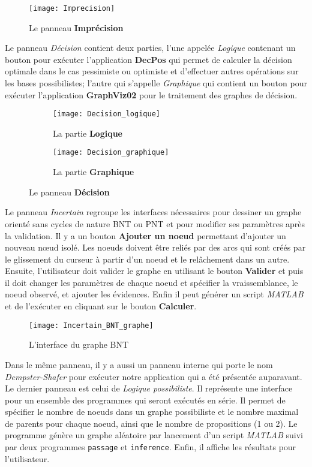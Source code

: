 \begin{figure}[H]
\centering
\texttt{[image: Imprecision]}
\caption{Le panneau \textbf{Imprécision}}
\end{figure}

Le panneau \textit{Décision} contient deux parties, l'une appelée \textit{Logique}
contenant un bouton pour exécuter l'application \textbf{DecPos} qui permet de calculer la décision optimale dans
le cas pessimiste ou optimiste et d'effectuer autres opérations sur les bases possibilistes; l'autre qui
s'appelle \textit{Graphique} qui contient un bouton pour exécuter l'application \textbf{GraphViz02} pour
le traitement des graphes de décision.

\begin{figure}[H]
\begin{subfigure}{0.49\textwidth}
\texttt{[image: Decision\_logique]}
\caption{La partie \textbf{Logique}}
\end{subfigure}
\hfill
\begin{subfigure}{0.49\textwidth}
\texttt{[image: Decision\_graphique]}
\caption{La partie \textbf{Graphique}}
\end{subfigure}
\caption{Le panneau \textbf{Décision}}
\end{figure}

\vspace*{1.5em}
Le panneau \textit{Incertain} regroupe les interfaces nécessaires pour dessiner un graphe orienté sans
cycles de nature BNT ou PNT et pour modifier ses paramètres après la validation. Il y a un bouton \textbf{Ajouter un noeud}
permettant d'ajouter un nouveau nœud isolé. Les noeuds doivent être reliés par des arcs qui sont créés par le
glissement du curseur à partir d'un noeud et le relâchement dans un autre. Ensuite, l'utilisateur doit valider le graphe
en utilisant le bouton \textbf{Valider} et puis il doit changer les paramètres de chaque noeud et spécifier la vraissemblance,
le noeud observé, et ajouter les évidences. Enfin il peut générer un script \textit{MATLAB} et de l'exécuter en cliquant
sur le bouton \textbf{Calculer}.
\vspace*{3em}

\begin{figure}[H]
\centering
\texttt{[image: Incertain\_BNT\_graphe]}
\caption{L'interface du graphe BNT}
\end{figure}
\vspace*{2em}

Dans le même panneau, il y a aussi un panneau interne qui porte le nom \textit{Dempster-Shafer} pour exécuter
notre application \appname qui a été présentée auparavant. Le dernier panneau est celui de \textit{Logique possibiliste}.
Il représente une interface pour un ensemble des programmes qui seront exécutés en série. Il permet de spécifier le nombre
de noeuds dans un graphe possibiliste et le nombre maximal de parents pour chaque noeud, ainsi que le nombre de propositions
(1 ou 2). Le programme génère un graphe aléatoire par lancement d'un script \textit{MATLAB} suivi par deux programmes
\texttt{passage} et \texttt{inference}. Enfin, il affiche les résultats pour l'utilisateur.

